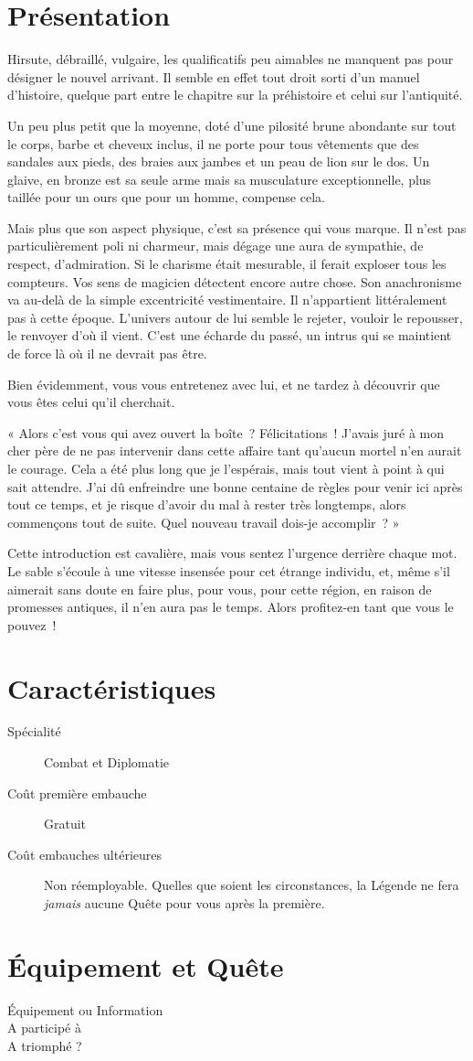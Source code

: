 \documentclass{report}
\newcommand{\herostats}[4]{
    \section{Présentation}

    #1

    \section{Caractéristiques}

    \begin{description}
        \item[Spécialité] #2
        \item[Coût première embauche] #3
        \item[Coût embauches ultérieures] #4
    \end{description}
}
\begin{document}
\herostats{
Hirsute, débraillé, vulgaire, les qualificatifs peu aimables ne manquent pas pour désigner le nouvel arrivant. Il semble en effet tout droit sorti d'un manuel d'histoire, quelque part entre le chapitre sur la préhistoire et celui sur l'antiquité.

Un peu plus petit que la moyenne, doté d'une pilosité brune abondante sur tout le corps, barbe et cheveux inclus, il ne porte pour tous vêtements que des sandales aux pieds, des braies aux jambes et un peau de lion sur le dos. Un glaive, en bronze est sa seule arme mais sa musculature exceptionnelle, plus taillée pour un ours que pour un homme, compense cela.

Mais plus que son aspect physique, c'est sa présence qui vous marque. Il n'est pas particulièrement poli ni charmeur, mais dégage une aura de sympathie, de respect, d'admiration. Si le charisme était mesurable, il ferait exploser tous les compteurs.
Vos sens de magicien détectent encore autre chose. Son anachronisme va au-delà de la simple excentricité vestimentaire. Il n'appartient littéralement pas à cette époque. L'univers autour de lui semble le rejeter, vouloir le repousser, le renvoyer d'où il vient. C'est une écharde du passé, un intrus qui se maintient de force là où il ne devrait pas être.

Bien évidemment, vous vous entretenez avec lui, et ne tardez à découvrir que vous êtes celui qu'il cherchait.

« Alors c'est vous qui avez ouvert la boîte ? Félicitations ! J'avais juré à mon cher père de ne pas intervenir dans cette affaire tant qu'aucun mortel n'en aurait le courage. Cela a été plus long que je l'espérais, mais tout vient à point à qui sait attendre. J'ai dû enfreindre une bonne centaine de règles pour venir ici après tout ce temps, et je risque d'avoir du mal à rester très longtemps, alors commençons tout de suite. Quel nouveau travail dois-je accomplir ? »

Cette introduction est cavalière, mais vous sentez l'urgence derrière chaque mot. Le sable s'écoule à une vitesse insensée pour cet étrange individu, et, même s'il aimerait sans doute en faire plus, pour vous, pour cette région, en raison de promesses antiques, il n'en aura pas le temps. Alors profitez-en tant que vous le pouvez !
}{
Combat et Diplomatie
}{
Gratuit
}{
Non réemployable. Quelles que soient les circonstances, la Légende ne fera \emph{jamais} aucune Quête pour vous après la première.
}


\section{Équipement et Quête}

\begin{framed}
\begin{Form}
\begin{description}
    \item[Équipement ou Information] \mytextfield{8cm}
    \item[A participé à] \mytextfield{8cm}
    \item[A triomphé ?] \mycheckbox
\end{description}
\end{Form}
\end{framed}
\end{document}
